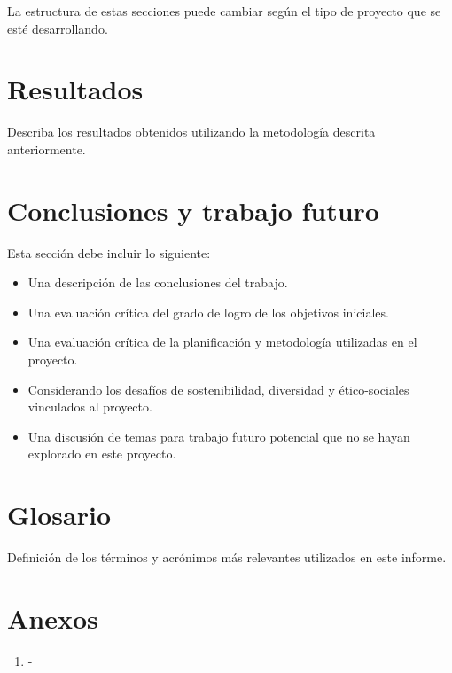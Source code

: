 \documentclass[12pt,a4paper,twoside,openany]{book}
\begin{document}
La estructura de estas secciones puede cambiar según el tipo de proyecto que se esté desarrollando.

\section{Resultados}

Describa los resultados obtenidos utilizando la metodología descrita anteriormente.

\section{Conclusiones y trabajo futuro}

Esta sección debe incluir lo siguiente:

\begin{itemize}
    \item Una descripción de las conclusiones del trabajo.
    \item Una evaluación crítica del grado de logro de los objetivos iniciales.
    \item Una evaluación crítica de la planificación y metodología utilizadas en el proyecto.
    \item Considerando los desafíos de sostenibilidad, diversidad y ético-sociales vinculados al proyecto.
    \item Una discusión de temas para trabajo futuro potencial que no se hayan explorado en este proyecto.
\end{itemize}

\section{Glosario}

Definición de los términos y acrónimos más relevantes utilizados en este informe.

\nocite{*}



\section{Anexos}

\begin{enumerate}
    \item -
\end{enumerate}
\end{document}
